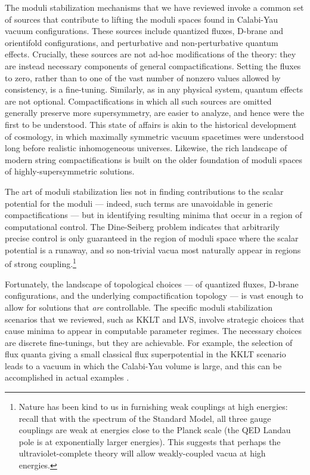 \documentclass[12pt,a4wide]{article}
\begin{document}
The moduli stabilization mechanisms that we have reviewed
invoke a common set of sources that contribute to lifting the moduli spaces found in Calabi-Yau vacuum configurations.
These sources include quantized fluxes, D-brane and orientifold configurations, and perturbative and non-perturbative quantum effects.
Crucially, these sources are not ad-hoc modifications of the theory: they are instead necessary components of 
general compactifications. 
Setting the fluxes to zero, rather than to one of the vast number of nonzero values allowed by consistency, is a fine-tuning. 
Similarly, as in any physical system, quantum effects are not optional. 
Compactifications in which all such sources are omitted generally preserve more supersymmetry, are easier to analyze, and hence were the first to be understood.  This state of affairs 
is akin to the historical development of cosmology, in which maximally symmetric vacuum spacetimes were understood long before realistic inhomogeneous universes.  
Likewise, the rich landscape of modern string compactifications is built on the older foundation of moduli spaces of highly-supersymmetric solutions.

The art of moduli stabilization lies not in finding contributions to the scalar potential for the moduli --- indeed, such terms are unavoidable in generic compactifications --- but in identifying resulting minima that occur in a region of computational control.
The Dine-Seiberg problem indicates that arbitrarily precise control is only guaranteed in the region of moduli space where the scalar potential is a runaway, and so non-trivial vacua most naturally  appear in regions of strong coupling.\footnote{Nature has been kind to us in furnishing weak couplings at high energies: recall that with the spectrum of the Standard Model, all three gauge couplings are weak  at energies close to the Planck scale (the QED Landau pole is at exponentially larger energies).  This suggests that perhaps 
the ultraviolet-complete theory will allow weakly-coupled vacua at high energies.}  


Fortunately, the landscape of topological choices --- of quantized fluxes, D-brane configurations, and the underlying compactification topology --- is vast enough to allow for solutions that \emph{are} controllable.  The specific moduli stabilization scenarios that we reviewed, such as KKLT and LVS, involve strategic choices that cause minima to appear in computable parameter regimes.  The necessary choices are discrete fine-tunings, but they are achievable.
For example, the selection of flux quanta giving a small classical flux superpotential in the KKLT scenario leads to a vacuum in which the  Calabi-Yau volume is large, and this can be accomplished in actual examples \cite{Demirtas:2021nlu}.
\end{document}
